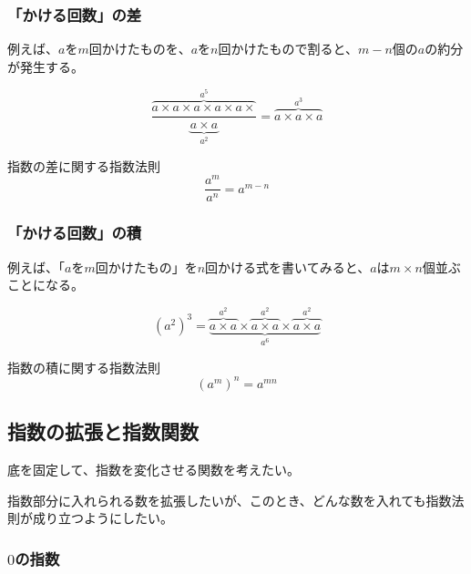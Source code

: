 \documentclass[16pt,b5paper]{book}
\begin{document}
\subsubsection{「かける回数」の差}

例えば、$a$を$m$回かけたものを、$a$を$n$回かけたもので割ると、$m-n$個の$a$の約分が発生する。

\begin{equation}
  \dfrac{\overbrace{a\times a\times a\times a\times a\times}^{a^5}}{\underbrace{a\times a}_{a^2}} = \overbrace{a\times a\times a}^{a^3}
\end{equation}

\begin{theorem}{指数の差に関する指数法則}
  \LARGE
  \begin{equation}
    \dfrac{a^m}{a^n} = a^{m-n}
  \end{equation}
\end{theorem}

\subsubsection{「かける回数」の積}

例えば、「$a$を$m$回かけたもの」を$n$回かける式を書いてみると、$a$は$m \times n$個並ぶことになる。

\begin{equation}
  (a^2)^3 = \underbrace{\overbrace{a\times a}^{a^2} \times \overbrace{a\times a}^{a^2} \times \overbrace{a\times a}^{a^2}}_{a^6}
\end{equation}

\begin{theorem}{指数の積に関する指数法則}
  \LARGE
  \begin{equation}
    (a^m)^n = a^{mn}
  \end{equation}
\end{theorem}

\subsection{指数の拡張と指数関数}

底を固定して、指数を変化させる関数を考えたい。

指数部分に入れられる数を拡張したいが、このとき、どんな数を入れても指数法則が成り立つようにしたい。

\subsubsection{$0$の指数}
\end{document}
